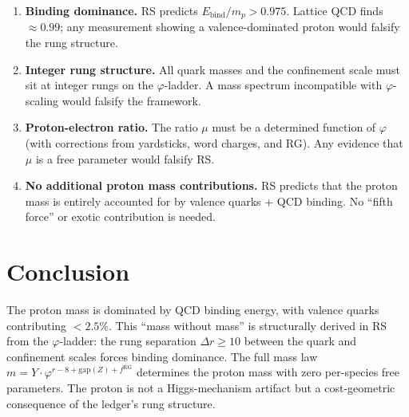 \documentclass[12pt,a4paper]{article}
\theoremstyle{definition}
\theoremstyle{remark}
\begin{document}
\begin{enumerate}[label=(\roman*)]
  \item \textbf{Binding dominance.}  RS predicts
  $E_{\mathrm{bind}}/m_p > 0.975$.  Lattice QCD finds
  $\approx 0.99$; any measurement showing a
  valence-dominated proton would falsify the rung
  structure.

  \item \textbf{Integer rung structure.}  All quark masses
  and the confinement scale must sit at integer rungs on
  the $\varphi$-ladder.  A mass spectrum incompatible
  with $\varphi$-scaling would falsify the framework.

  \item \textbf{Proton-electron ratio.}  The ratio $\mu$
  must be a determined function of $\varphi$ (with
  corrections from yardsticks, word charges, and RG).
  Any evidence that $\mu$ is a free parameter would
  falsify RS.

  \item \textbf{No additional proton mass contributions.}
  RS predicts that the proton mass is entirely accounted
  for by valence quarks + QCD binding.  No ``fifth force''
  or exotic contribution is needed.
\end{enumerate}

\section{Conclusion}
\label{sec:conclusion}

The proton mass is dominated by QCD binding energy, with
valence quarks contributing $< 2.5\%$.  This ``mass without
mass'' is structurally derived in RS from the
$\varphi$-ladder: the rung separation $\Delta r \geq 10$
between the quark and confinement scales forces binding
dominance.  The full mass law
$m = Y \cdot \varphi^{r - 8 + \mathrm{gap}(Z) + f^{\mathrm{RG}}}$
determines the proton mass with zero per-species free
parameters.  The proton is not a Higgs-mechanism artifact but
a cost-geometric consequence of the ledger's rung structure.
\end{document}
